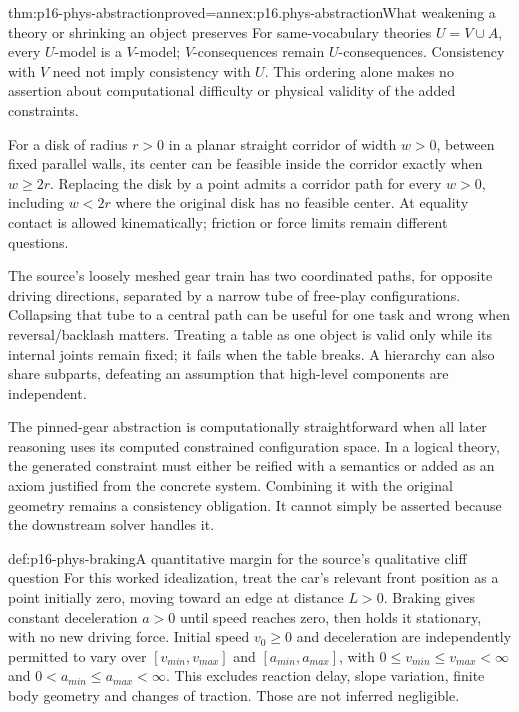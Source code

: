 \begin{hbtheorem}{thm:p16-phys-abstraction}{proved=annex:p16.phys-abstraction}{What weakening a theory or shrinking an object preserves}
For same-vocabulary theories \(U=V\cup A\), every \(U\)-model is
a \(V\)-model; \(V\)-consequences remain \(U\)-consequences.
Consistency with \(V\) need not imply consistency with \(U\).
This ordering alone makes no assertion about computational difficulty or
physical validity of the added constraints.

For a disk of radius \(r>0\) in a planar straight corridor of width
\(w>0\), between fixed parallel walls, its center can be feasible inside
the corridor exactly when \(w\ge2r\). Replacing the disk by a point
admits a corridor path for every \(w>0\), including \(w<2r\) where
the original disk has no feasible center. At equality contact is allowed
kinematically; friction or force limits remain different questions.
\end{hbtheorem}

The source's loosely meshed gear train has two coordinated paths, for
opposite driving directions, separated by a narrow tube of free-play
configurations. Collapsing that tube to a central path can be useful for
one task and wrong when reversal/backlash matters. Treating a table as one
object is valid only while its internal joints remain fixed; it fails when
the table breaks. A hierarchy can also share subparts, defeating an
assumption that high-level components are independent.

The pinned-gear abstraction is computationally straightforward when all
later reasoning uses its computed constrained configuration space. In a
logical theory, the generated constraint must either be reified with a
semantics or added as an axiom justified from the concrete system.
Combining it with the original geometry remains a consistency obligation.
It cannot simply be asserted because the downstream solver handles it.

\begin{hbdefinition}{def:p16-phys-braking}{A quantitative margin for the source's qualitative cliff question}
For this worked idealization, treat the car's relevant front position as
a point initially zero, moving toward an edge at distance \(L>0\).
Braking gives constant deceleration \(a>0\) until speed reaches zero,
then holds it stationary, with no new driving force. Initial speed
\(v_0\ge0\) and deceleration are independently permitted to vary over
\([v_{min},v_{max}]\) and \([a_{min},a_{max}]\), with
\(0\le v_{min}\le v_{max}<\infty\) and
\(0<a_{min}\le a_{max}<\infty\). This excludes reaction delay, slope variation, finite
body geometry and changes of traction. Those are not inferred negligible.
\end{hbdefinition}

